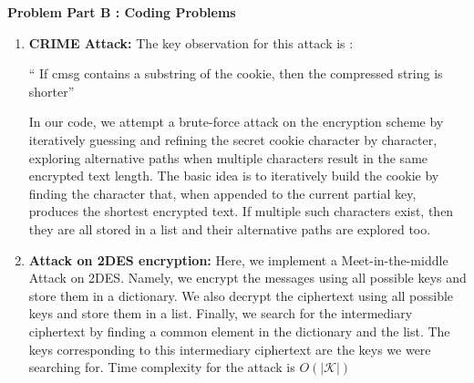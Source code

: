 \documentclass[a4paper, 11pt]{article}
\newcommand{\prob}[1]{\begin{mdframed}[backgroundcolor=gray!20] \textbf{Problem #1}\end{mdframed}}
\newcommand{\calK}{\mathcal{K}}
\begin{document}
\prob{Part B : Coding Problems}
\begin{enumerate}
    \item \textbf{CRIME Attack: } The key observation for this attack is : 
    \begin{center} `` If \textsf{cmsg} contains a substring of the \textsf{cookie}, then the compressed string is shorter''\end{center}

     In our code, we attempt a brute-force attack on the encryption scheme by iteratively guessing and refining the secret cookie character by character, exploring alternative paths when multiple characters result in the same encrypted text length. The basic idea is to iteratively build the cookie by finding the character that, when appended to the current partial key, produces the shortest encrypted text. If multiple such characters exist, then they are all stored in a list and their alternative paths are explored too.

     \item \textbf{Attack on 2DES encryption: } Here, we implement a Meet-in-the-middle Attack on 2DES. Namely, we encrypt the messages using all possible keys and store them in a dictionary. We also decrypt the ciphertext using all possible keys and store them in a list. Finally, we search for the intermediary ciphertext by finding a common element in the dictionary and the list. The keys corresponding to this intermediary ciphertext are the keys we were searching for. Time complexity for the attack is $O(|\calK|)$
\end{enumerate}
\end{document}
